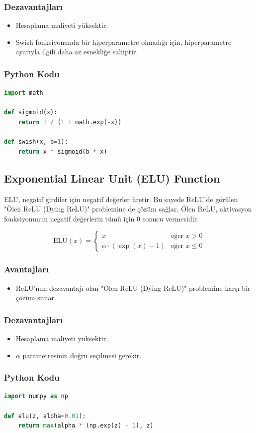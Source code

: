 \subsubsection{Dezavantajları}
\begin{itemize}
    \item Hesaplama maliyeti yüksektir.
    \item Swish fonksiyonunda bir hiperparametre olmadığı için, hiperparametre ayarıyla ilgili daha az esnekliğe sahiptir.
\end{itemize}

\subsubsection{Python Kodu}

\begin{lstlisting}[language=Python]
import math

def sigmoid(x):
    return 1 / (1 + math.exp(-x))

def swish(x, b=1):
    return x * sigmoid(b * x)
\end{lstlisting}

\newpage

\subsection{Exponential Linear Unit (ELU) Function}

ELU, negatif girdiler için negatif değerler üretir. Bu sayede ReLU'de görülen "Ölen ReLU (Dying ReLU)" problemine de çözüm sağlar. Ölen ReLU, aktivasyon fonksiyonunun negatif değerlerin tümü için 0 sonucu vermesidir.

\[ \text{ELU}(x) = 
\begin{cases} 
x & \text{eğer } x > 0 \\
\alpha \cdot (\exp(x) - 1) & \text{eğer } x \leq 0
\end{cases}
\]

\subsubsection{Avantajları}
\begin{itemize}
    \item ReLU'nun dezavantajı olan "Ölen ReLU (Dying ReLU)" problemine karşı bir çözüm sunar.
\end{itemize}

\subsubsection{Dezavantajları}
\begin{itemize}
    \item Hesaplama maliyeti yüksektir.
    \item $\alpha$ parametresinin doğru seçilmesi gerekir.
\end{itemize}

\subsubsection{Python Kodu}

\begin{lstlisting}[language=Python]
import numpy as np

def elu(z, alpha=0.01):
    return max(alpha * (np.exp(z) - 1), z)
\end{lstlisting}

\newpage